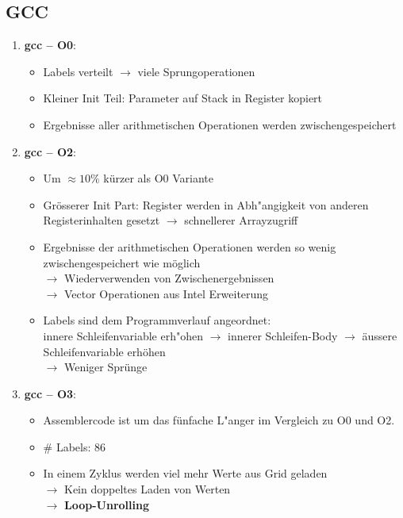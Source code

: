 \documentclass{article}
\begin{document}
\subsection*{GCC}
\begin{enumerate}
	\item{ \textbf{gcc -- O0}:
			\begin{itemize}
				\item Labels verteilt $\rightarrow$ viele Sprungoperationen
				\item Kleiner Init Teil: Parameter auf Stack in Register kopiert
				\item Ergebnisse aller arithmetischen Operationen werden zwischengespeichert
			\end{itemize}
		}
	\item{ \textbf{gcc -- O2}:
			\begin{itemize}
				\item Um $\approx 10\%$ k\"urzer als O0 Variante
				\item Gr\"osserer Init Part: Register werden in Abh"angigkeit
					von anderen Registerinhalten gesetzt $\rightarrow$ schnellerer Arrayzugriff
				\item Ergebnisse der arithmetischen Operationen werden so wenig
					zwischengespeichert wie m\"oglich\\
					$\rightarrow$ Wiederverwenden von Zwischenergebnissen\\
					$\rightarrow$ Vector Operationen aus Intel Erweiterung
				\item Labels sind dem Programmverlauf angeordnet:\\
					innere Schleifenvariable erh"ohen $\rightarrow$ innerer Schleifen-Body $\rightarrow$
					\"aussere Schleifenvariable erh\"ohen\\
					$\longrightarrow$ Weniger Spr\"unge
			\end{itemize}
		}
	\item{ \textbf{gcc -- O3}:
			\begin{itemize}
				\item Assemblercode ist um das f\"unfache L"anger im Vergleich
					zu O0 und O2.
				\item \# Labels: 86
				\item In einem Zyklus werden viel mehr Werte aus Grid geladen\\
					$\rightarrow$ Kein doppeltes Laden von Werten\\
					$\rightarrow$ \textbf{Loop-Unrolling}
			\end{itemize}
		}
\end{enumerate}
\end{document}
